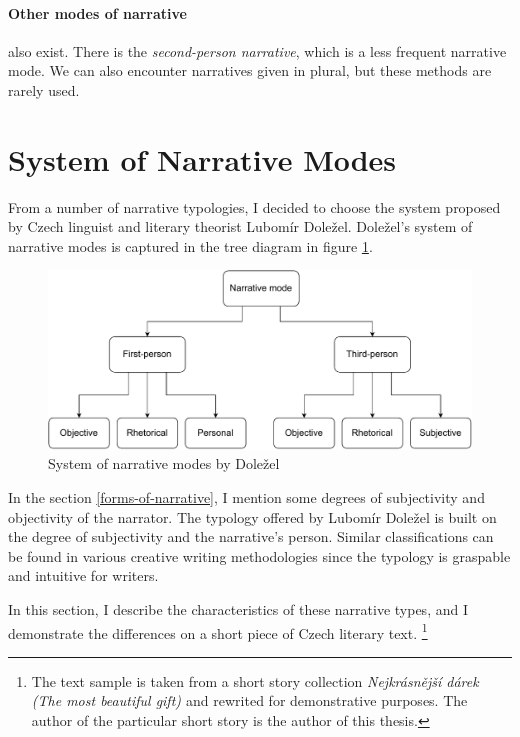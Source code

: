 \paragraph{Other modes of narrative} also exist. There is the \emph{second-person narrative}, which is a less frequent narrative mode. We can also encounter narratives given in plural, but these methods are rarely used.

\section{System of Narrative Modes}

From a number of narrative typologies, I decided to choose the system proposed by Czech linguist and literary theorist Lubomír Doležel. Doležel's system of narrative modes is captured in the tree diagram in figure \ref{fig:schema-dolezel}.\cite{dolezel-narativni-zpusoby}

\begin{figure}[ht]
\includegraphics[width=1\textwidth]{data/dolezel-schema.pdf}
\caption{System of narrative modes by Doležel}
\label{fig:schema-dolezel}
\end{figure}

In the section \ref{forms-of-narrative}, I mention some degrees of subjectivity and objectivity of the narrator. The typology offered by Lubomír Doležel is built on the degree of subjectivity and the narrative's person. Similar classifications can be found in various creative writing methodologies \cite{docekalova} since the typology is graspable and intuitive for writers.

In this section, I describe the characteristics of these narrative types, and I demonstrate the differences on a short piece of Czech literary text. \footnote{The text sample is taken from a short story collection \emph{Nejkrásnější dárek (The most beautiful gift) \cite{nejkrasnejsi-darek}} and rewrited for demonstrative purposes. The author of the particular short story is the author of this thesis.}

